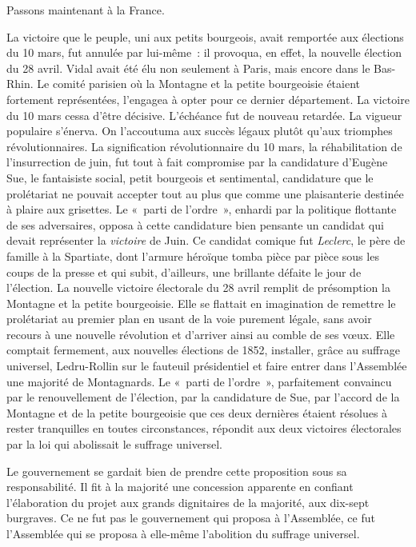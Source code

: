 \documentclass[twoside]{book} %
\begin{document}
Passons maintenant à la France.\par
La victoire que le peuple, uni aux petits bourgeois, avait remportée aux élections du 10 mars, fut annulée par lui-même : il provoqua, en effet, la nouvelle élection du 28 avril. Vidal avait été élu non seulement à Paris, mais encore dans le Bas-Rhin. Le comité parisien où la Montagne et la petite bourgeoisie étaient fortement représentées, l’engagea à opter pour ce dernier département. La victoire du 10 mars cessa d’être décisive. L’échéance fut de nouveau retardée. La vigueur populaire s’énerva. On l’accoutuma aux succès légaux plutôt qu’aux triomphes révolutionnaires. La signification révolutionnaire du 10 mars, la réhabilitation de l’insurrection de juin, fut tout à fait compromise par la candidature d’Eugène Sue, le fantaisiste social, petit bourgeois et sentimental, candidature que le prolétariat ne pouvait accepter tout au plus que comme une plaisanterie destinée à plaire aux grisettes. Le « parti de l’ordre », enhardi par la politique flottante de ses adversaires, opposa à cette candidature bien pensante un candidat qui devait représenter la \emph{victoire} de Juin. Ce candidat comique fut \emph{Leclerc}, le père de famille à la Spartiate, dont l’armure héroïque tomba pièce par pièce sous les coups de la presse et qui subit, d’ailleurs, une brillante défaite le jour de l’élection. La nouvelle victoire électorale du 28 avril remplit de présomption la Montagne et la petite bourgeoisie. Elle se flattait en imagination de remettre le prolétariat au premier plan en usant de la voie purement légale, sans avoir recours à une nouvelle révolution et d’arriver ainsi au comble de ses vœux. Elle comptait fermement, aux nouvelles élections de 1852, installer, grâce au suffrage universel, Ledru-Rollin sur le fauteuil présidentiel et faire entrer dans l’Assemblée une majorité de Montagnards. Le « parti de l’ordre », parfaitement convaincu par le renouvellement de l’élection, par la candidature de Sue, par l’accord de la Montagne et de la petite bourgeoisie que ces deux dernières étaient résolues à rester tranquilles en toutes circonstances, répondit aux deux victoires électorales par la loi qui abolissait le suffrage universel.\par
Le gouvernement se gardait bien de prendre cette proposition sous sa responsabilité. Il fit à la majorité une concession apparente en confiant l’élaboration du projet aux grands dignitaires de la majorité, aux dix-sept burgraves. Ce ne fut pas le gouvernement qui proposa à l’Assemblée, ce fut l’Assemblée qui se proposa à elle-même l’abolition du suffrage universel.\par
\end{document}
